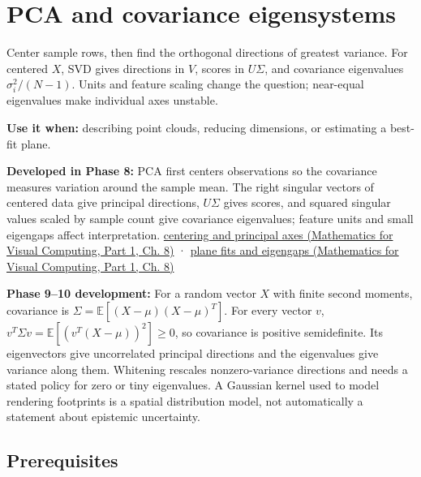 \hypertarget{appendix-ad175ef3c5bf}{}\label{referencestart:appendix-ad175ef3c5bf}
\section{PCA and covariance eigensystems}\label{appendix-ad175ef3c5bf-pca-and-covariance-eigensystems}

\hypertarget{appendix-ad175ef3c5bf-pca-and-covariance-eigensystems}{}

Center sample rows, then find the orthogonal directions of greatest variance. For centered \(X\), SVD gives directions in \(V\), scores in \(U\Sigma\), and covariance eigenvalues \(\sigma_i^2/(N-1)\). Units and feature scaling change the question; near-equal eigenvalues make individual axes unstable.

\textbf{Use it when:} describing point clouds, reducing dimensions, or estimating a best-fit plane.

\textbf{Developed in Phase 8:} PCA first centers observations so the covariance measures variation around the sample mean. The right singular vectors of centered data give principal directions, \(U\Sigma\) gives scores, and squared singular values scaled by sample count give covariance eigenvalues; feature units and small eigengaps affect interpretation. \href{../02-Mathematics-for-Visual-Computing-P01/main.pdf\#nameddest=02-foundations-ii-ch024-centered-measurements-reveal-principal-directions}{centering and principal axes (Mathematics for Visual Computing, Part 1, Ch. 8)} · \href{../02-Mathematics-for-Visual-Computing-P01/main.pdf\#nameddest=02-foundations-ii-ch024-plane-fits-eigengaps-and-interpretation-of-uncertain-components}{plane fits and eigengaps (Mathematics for Visual Computing, Part 1, Ch. 8)}

\textbf{Phase 9--10 development:} For a random vector \(X\) with finite second moments, covariance is \(\Sigma=\mathbb E[(X-\mu)(X-\mu)^T]\). For every vector \(v\), \(v^T\Sigma v=\mathbb E[(v^T(X-\mu))^2]\geq0\), so covariance is positive semidefinite. Its eigenvectors give uncorrelated principal directions and the eigenvalues give variance along them. Whitening rescales nonzero-variance directions and needs a stated policy for zero or tiny eigenvalues. A Gaussian kernel used to model rendering footprints is a spatial distribution model, not automatically a statement about epistemic uncertainty.

\subsection{Prerequisites}\label{appendix-ad175ef3c5bf-prerequisites}

